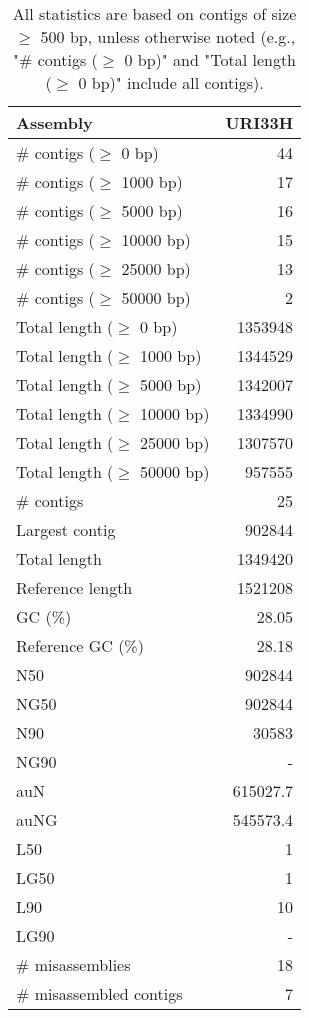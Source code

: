 \documentclass[12pt,a4paper]{article}
\begin{document}
\begin{table}[ht]
\begin{center}
\caption{All statistics are based on contigs of size $\geq$ 500 bp, unless otherwise noted (e.g., "\# contigs ($\geq$ 0 bp)" and "Total length ($\geq$ 0 bp)" include all contigs).}
\begin{tabular}{|l*{1}{|r}|}
\hline
Assembly & URI33H \\ \hline
\# contigs ($\geq$ 0 bp) & 44 \\ \hline
\# contigs ($\geq$ 1000 bp) & 17 \\ \hline
\# contigs ($\geq$ 5000 bp) & 16 \\ \hline
\# contigs ($\geq$ 10000 bp) & 15 \\ \hline
\# contigs ($\geq$ 25000 bp) & 13 \\ \hline
\# contigs ($\geq$ 50000 bp) & 2 \\ \hline
Total length ($\geq$ 0 bp) & 1353948 \\ \hline
Total length ($\geq$ 1000 bp) & 1344529 \\ \hline
Total length ($\geq$ 5000 bp) & 1342007 \\ \hline
Total length ($\geq$ 10000 bp) & 1334990 \\ \hline
Total length ($\geq$ 25000 bp) & 1307570 \\ \hline
Total length ($\geq$ 50000 bp) & 957555 \\ \hline
\# contigs & 25 \\ \hline
Largest contig & 902844 \\ \hline
Total length & 1349420 \\ \hline
Reference length & 1521208 \\ \hline
GC (\%) & 28.05 \\ \hline
Reference GC (\%) & 28.18 \\ \hline
N50 & 902844 \\ \hline
NG50 & 902844 \\ \hline
N90 & 30583 \\ \hline
NG90 & - \\ \hline
auN & 615027.7 \\ \hline
auNG & 545573.4 \\ \hline
L50 & 1 \\ \hline
LG50 & 1 \\ \hline
L90 & 10 \\ \hline
LG90 & - \\ \hline
\# misassemblies & 18 \\ \hline
\# misassembled contigs & 7 \\ \hline

\end{tabular}
\end{center}
\end{table}
\end{document}
